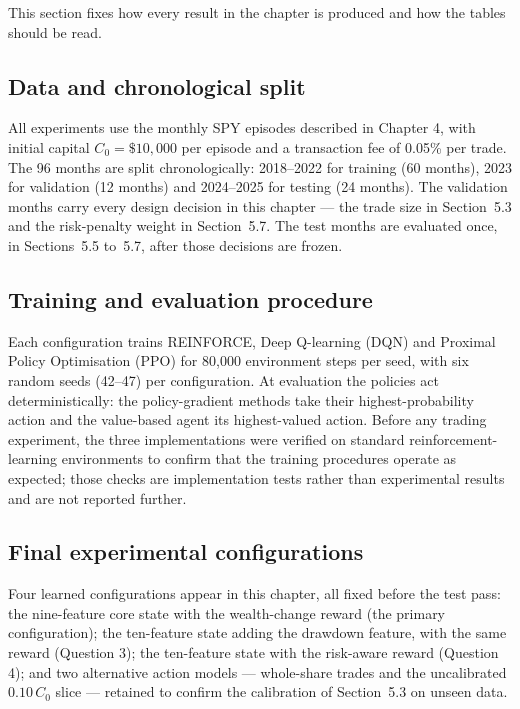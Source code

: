 This section fixes how every result in the chapter is produced and how the
tables should be read.

\subsection{Data and chronological split}

All experiments use the monthly SPY episodes described in Chapter 4, with
initial capital $C_0 = \$10{,}000$ per episode and a transaction fee of
0.05\% per trade. The 96 months are split chronologically: 2018--2022 for
training (60 months), 2023 for validation (12 months) and 2024--2025 for
testing (24 months). The validation months carry every design decision in
this chapter --- the trade size in Section~5.3 and the risk-penalty weight
in Section~5.7. The test months are evaluated once, in Sections~5.5
to~5.7, after those decisions are frozen.

\subsection{Training and evaluation procedure}

Each configuration trains REINFORCE, Deep Q-learning (DQN) and Proximal
Policy Optimisation (PPO) for 80{,}000 environment steps per seed, with six
random seeds (42--47) per configuration. At evaluation the policies act
deterministically: the policy-gradient methods take their highest-probability
action and the value-based agent its highest-valued action. Before any
trading experiment, the three implementations were verified on standard
reinforcement-learning environments to confirm that the training procedures
operate as expected; those checks are implementation tests rather than
experimental results and are not reported further.

\subsection{Final experimental configurations}

Four learned configurations appear in this chapter, all fixed before the
test pass: the nine-feature core state with the wealth-change reward (the
primary configuration); the ten-feature state adding the drawdown feature,
with the same reward (Question 3); the ten-feature state with the risk-aware
reward (Question 4); and two alternative action models --- whole-share
trades and the uncalibrated $0.10\,C_0$ slice --- retained to confirm the
calibration of Section~5.3 on unseen data.


